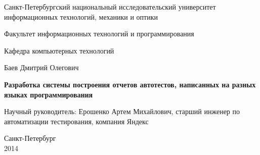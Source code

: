 \documentclass[a4paper]{report}
\theoremstyle{plain}
\theoremstyle{definition}
\numberwithin{theorem}{chapter}        %
\begin{document}
\renewcommand{\thelstlisting}{\thesection.\arabic{lstlisting}}
\initializefrontsections

\pagestyle{title}

\begin{center}
Санкт-Петербургский национальный исследовательский университет \\ информационных технологий, механики и оптики

\vspace{2cm}

Факультет информационных технологий и программирования

Кафедра компьютерных технологий

\vspace{3cm}

{\Large Баев Дмитрий Олегович}

\vspace{2cm}

\vbox{\LARGE\bfseries
Разработка системы построения отчетов автотестов, написанных на разных языках программирования
}

\vspace{4cm}

{\Large Научный руководитель: Ерошенко Артем Михайлович, старший инженер по автоматизации тестирования, компания Яндекс}

\vspace{6cm}

Санкт-Петербург\\ 2014
\end{center}

\newpage

\setcounter{page}{3}
\pagestyle{plain}

\tableofcontents
\startthechapters






\printbibliography

%
\end{document}
